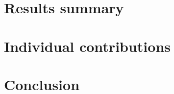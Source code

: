 \documentclass[english]{article}
\begin{document}
\section{Results summary}

\section{Individual contributions}

\section{Conclusion}


\begin{thebibliography}{1}
	
	

\end{thebibliography}



\end{document}
